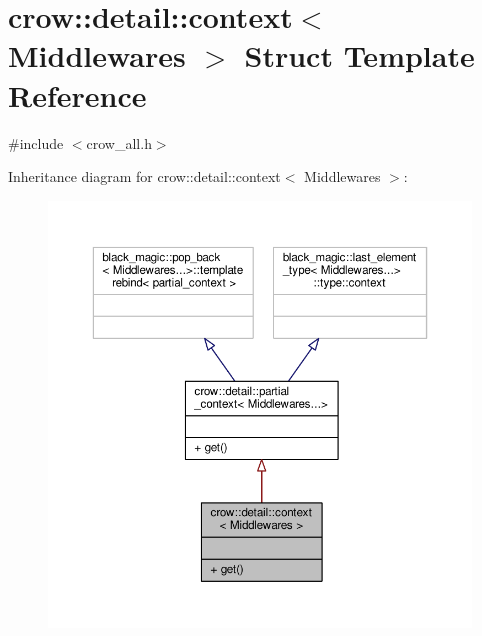 \hypertarget{structcrow_1_1detail_1_1context}{\section{crow\-:\-:detail\-:\-:context$<$ Middlewares $>$ Struct Template Reference}
\label{structcrow_1_1detail_1_1context}
}


{\ttfamily \#include $<$crow\-\_\-all.\-h$>$}



Inheritance diagram for crow\-:\-:detail\-:\-:context$<$ Middlewares $>$\-:
\nopagebreak
\begin{figure}[H]
\begin{center}
\leavevmode
\includegraphics[width=350pt]{structcrow_1_1detail_1_1context__inherit__graph}
\end{center}
\end{figure}


